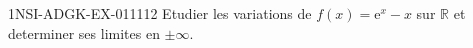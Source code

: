 \begin{exercice}{1NSI-ADGK-EX-011}{1}{12}
Etudier les variations de $f(x) = \mathrm{e}^x - x$ sur $\mathbb{R}$ et determiner ses limites en $\pm\infty$.

\end{exercice}
